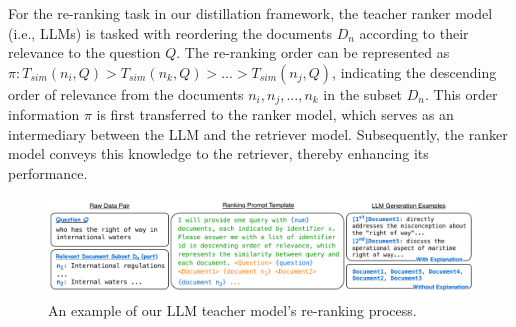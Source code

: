 For the re-ranking task in our distillation framework, the teacher ranker model (i.e., LLMs) is tasked with reordering the documents $D_n$ according to their relevance to the question $Q$.
The re-ranking order can be represented as $\pi: T_{sim}(n_i, Q)>T_{sim}(n_k, Q) > ... > T_{sim}(n_j, Q)$, indicating the descending order of relevance from the documents $n_i, n_j, ..., n_k$ in the subset $D_n$.
This order information $\pi$ is first transferred to the ranker model, which serves as an intermediary between the LLM and the retriever model.
Subsequently, the ranker model conveys this knowledge to the retriever, thereby enhancing its performance.

\begin{figure}
    \centering
    \includegraphics[width=1.0\textwidth]{latex/pic/fig3.pdf}
    \caption{An example of our LLM teacher model's re-ranking process.}
    \label{fig:03}
\end{figure}

